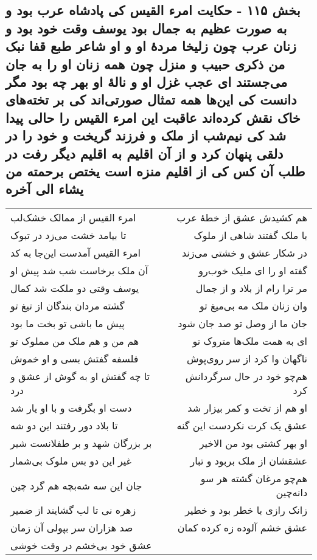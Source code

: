 \begin{center}
\section*{بخش ۱۱۵ - حکایت امرء القیس کی پادشاه عرب بود و به صورت عظیم به جمال بود یوسف وقت خود بود و زنان عرب چون زلیخا مردهٔ او و او شاعر طبع قفا نبک من ذکری حبیب و منزل چون همه زنان او را به جان می‌جستند ای عجب غزل او و نالهٔ او بهر چه بود مگر دانست کی این‌ها همه تمثال صورتی‌اند کی بر تخته‌های خاک نقش کرده‌اند عاقبت این امرء القیس را حالی پیدا شد کی نیم‌شب از ملک و فرزند گریخت و خود را در دلقی پنهان کرد و از آن اقلیم به اقلیم دیگر رفت در طلب آن کس کی از اقلیم منزه است یختص برحمته من یشاء الی آخره}
\label{sec:sh115}
\begin{longtable}{l p{0.5cm} r}
امرء القیس از ممالک خشک‌لب
&&
هم کشیدش عشق از خطهٔ عرب
\\
تا بیامد خشت می‌زد در تبوک
&&
با ملک گفتند شاهی از ملوک
\\
امرء القیس آمدست این‌جا به کد
&&
در شکار عشق و خشتی می‌زند
\\
آن ملک برخاست شب شد پیش او
&&
گفته او را ای ملیک خوب‌رو
\\
یوسف وقتی دو ملکت شد کمال
&&
مر ترا رام از بلاد و از جمال
\\
گشته مردان بندگان از تیغ تو
&&
وان زنان ملک مه بی‌میغ تو
\\
پیش ما باشی تو بخت ما بود
&&
جان ما از وصل تو صد جان شود
\\
هم من و هم ملک من مملوک تو
&&
ای به همت ملک‌ها متروک تو
\\
فلسفه گفتش بسی و او خموش
&&
ناگهان وا کرد از سر روی‌پوش
\\
تا چه گفتش او به گوش از عشق و درد
&&
هم‌چو خود در حال سرگردانش کرد
\\
دست او بگرفت و با او یار شد
&&
او هم از تخت و کمر بیزار شد
\\
تا بلاد دور رفتند این دو شه
&&
عشق یک کرت نکردست این گنه
\\
بر بزرگان شهد و بر طفلانست شیر
&&
او بهر کشتی بود من الاخیر
\\
غیر این دو بس ملوک بی‌شمار
&&
عشقشان از ملک بربود و تبار
\\
جان این سه شه‌بچه هم گرد چین
&&
هم‌چو مرغان گشته هر سو دانه‌چین
\\
زهره نی تا لب گشایند از ضمیر
&&
زانک رازی با خطر بود و خطیر
\\
صد هزاران سر بپولی آن زمان
&&
عشق خشم آلوده زه کرده کمان
\\
عشق خود بی‌خشم در وقت خوشی

\end{longtable}
\end{center}
